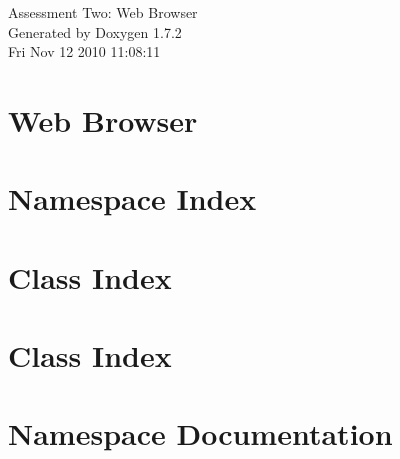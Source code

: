 \documentclass[a4paper]{book}
\begin{document}
\hypersetup{pageanchor=false}
\begin{titlepage}
\vspace*{7cm}
\begin{center}
{\Large Assessment Two: Web Browser }\\
\vspace*{1cm}
{\large Generated by Doxygen 1.7.2}\\
\vspace*{0.5cm}
{\small Fri Nov 12 2010 11:08:11}\\
\end{center}
\end{titlepage}
\clearemptydoublepage
{}
\tableofcontents
\clearemptydoublepage
{}
\hypersetup{pageanchor=true}
\chapter{Web Browser}
\label{index}\hypertarget{index}{}
\chapter{Namespace Index}

\chapter{Class Index}

\chapter{Class Index}

\chapter{Namespace Documentation}






\end{document}

